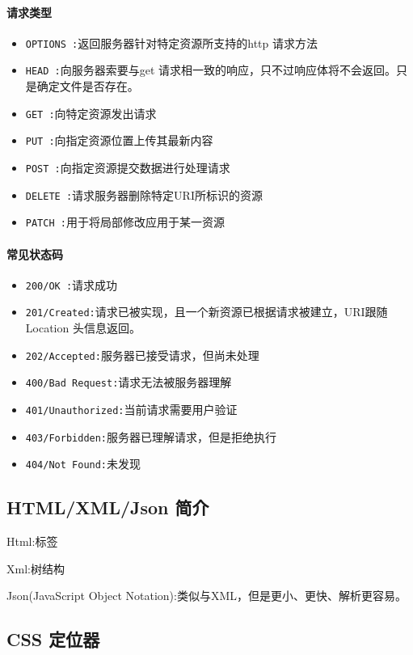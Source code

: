 \documentclass[UTF8,a4paper,12pt]{ctexbook}
\begin{document}
			\paragraph{请求类型}
				\begin{itemize}
					\item \verb|OPTIONS :|返回服务器针对特定资源所支持的http 请求方法
					\item \verb|HEAD :|向服务器索要与get 请求相一致的响应，只不过响应体将不会返回。只是确定文件是否存在。
					\item \verb|GET :|向特定资源发出请求
					\item \verb|PUT :|向指定资源位置上传其最新内容
					\item \verb|POST :|向指定资源提交数据进行处理请求
					\item \verb|DELETE :|请求服务器删除特定URI所标识的资源
					\item \verb|PATCH :|用于将局部修改应用于某一资源
				\end{itemize}
			
			\paragraph{常见状态码}
				\begin{itemize}
					\item \verb|200/OK :|请求成功
					\item \verb|201/Created:|请求已被实现，且一个新资源已根据请求被建立，URI跟随Location 头信息返回。
					\item \verb|202/Accepted:|服务器已接受请求，但尚未处理
					\item \verb|400/Bad Request:|请求无法被服务器理解
					\item \verb|401/Unauthorized:|当前请求需要用户验证
					\item \verb|403/Forbidden:|服务器已理解请求，但是拒绝执行
					\item \verb|404/Not Found:|未发现
				\end{itemize}
				
		\subsection{HTML/XML/Json 简介}
			Html:标签
			
			Xml:树结构
			
			Json(JavaScript Object Notation):类似与XML，但是更小、更快、解析更容易。
		
		\subsection{CSS 定位器}
				
\end{document}
